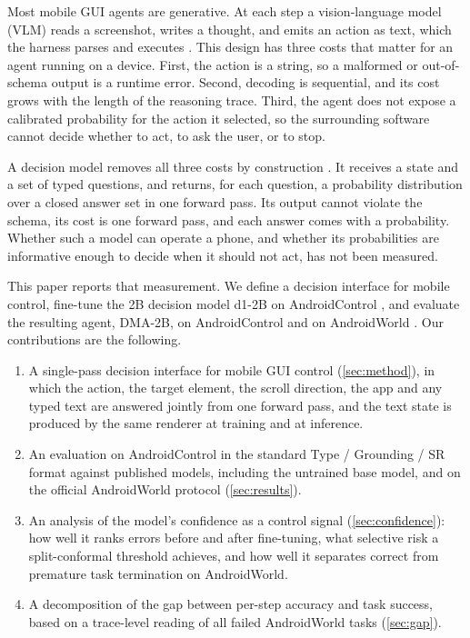 \documentclass{article}
\newcommand{\ours}{DMA-2B}
\begin{document}
Most mobile GUI agents are generative. At each step a vision-language model (VLM) reads a screenshot, writes
a thought, and emits an action as text, which the harness parses and executes
\citep{androidworld2024,uitars2025,mobileagentv3,mobilerl2025}. This design has three costs that matter for an
agent running on a device. First, the action is a string, so a malformed or out-of-schema output is a runtime
error. Second, decoding is sequential, and its cost grows with the length of the reasoning trace. Third, the
agent does not expose a calibrated probability for the action it selected, so the surrounding software cannot
decide whether to act, to ask the user, or to stop.

A decision model removes all three costs by construction \citep{typesafe2026,liquidd12026}. It receives a
state and a set of typed questions, and returns, for each question, a probability distribution over a
closed answer set in one forward pass. Its output cannot violate the schema, its cost is one forward pass, and
each answer comes with a probability. Whether such a model can operate a phone, and whether its probabilities
are informative enough to decide when it should not act, has not been measured.

This paper reports that measurement. We define a decision interface for mobile control, fine-tune the 2B
decision model d1-2B \citep{liquidd12026} on AndroidControl \citep{androidcontrol2024}, and evaluate the
resulting agent, \ours{}, on AndroidControl and on AndroidWorld \citep{androidworld2024}. Our contributions are
the following.
\begin{enumerate}
  \item A single-pass decision interface for mobile GUI control (\cref{sec:method}), in which the action, the
        target element, the scroll direction, the app and any typed text are answered jointly from one forward
        pass, and the text state is produced by the same renderer at training and at inference.
  \item An evaluation on AndroidControl in the standard Type / Grounding / SR format against published models,
        including the untrained base model, and on the official AndroidWorld protocol (\cref{sec:results}).
  \item An analysis of the model's confidence as a control signal (\cref{sec:confidence}): how well it ranks
        errors before and after fine-tuning, what selective risk a split-conformal threshold achieves, and how
        well it separates correct from premature task termination on AndroidWorld.
  \item A decomposition of the gap between per-step accuracy and task success, based on a trace-level reading of
        all failed AndroidWorld tasks (\cref{sec:gap}).
\end{enumerate}
\end{document}
